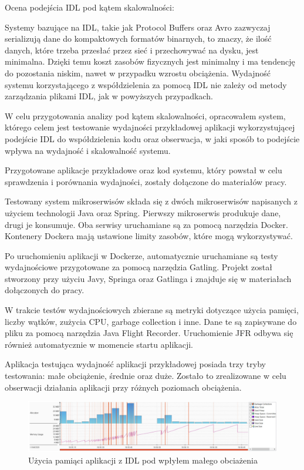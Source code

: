 \documentclass[runningheads,12pt]{llncs}
\begin{document}
Ocena podejścia IDL pod kątem skalowalności:

Systemy bazujące na IDL, takie jak Protocol Buffers oraz Avro zazwyczaj serializują dane do kompaktowych formatów binarnych, to znaczy, że ilość danych, które trzeba przesłać przez sieć i przechowywać na dysku, jest minimalna. Dzięki temu koszt zasobów fizycznych jest minimalny i ma tendencję do pozostania niskim, nawet w przypadku wzrostu obciążenia. Wydajność systemu korzystającego z współdzielenia za pomocą IDL nie zależy od metody zarządzania plikami IDL, jak w powyższych przypadkach.

W celu przygotowania analizy pod kątem skalowalności, opracowałem system, którego celem jest testowanie wydajności przykładowej aplikacji wykorzystującej podejście IDL do współdzielenia kodu oraz obserwacja, w jaki sposób to podejście wpływa na wydajność i skalowalność systemu.

Przygotowane aplikacje przykładowe oraz kod systemu, który powstał w celu sprawdzenia i porównania wydajności, zostały dołączone do materiałów pracy.

Testowany system mikroserwisów składa się z dwóch mikroserwisów napisanych z użyciem technologii Java oraz Spring. Pierwszy mikroserwis produkuje dane, drugi je konsumuje. Oba serwisy uruchamiane są za pomocą narzędzia Docker. Kontenery Dockera mają ustawione limity zasobów, które mogą wykorzystywać.

Po uruchomieniu aplikacji w Dockerze, automatycznie uruchamiane są testy wydajnościowe przygotowane za pomocą narzędzia Gatling. Projekt został stworzony przy użyciu Javy, Springa oraz Gatlinga i znajduje się w materiałach dołączonych do pracy.

W trakcie testów wydajnościowych zbierane są metryki dotyczące użycia pamięci, liczby wątków, zużycia CPU, garbage collection i inne. Dane te są zapisywane do pliku za pomocą narzędzia Java Flight Recorder. Uruchomienie JFR odbywa się również automatycznie w momencie startu aplikacji.

Aplikacja testująca wydajność aplikacji przykładowej posiada trzy tryby testowania: małe obciążenie, średnie oraz duże. Zostało to zrealizowane w celu obserwacji działania aplikacji przy różnych poziomach obciążenia.

\newpage

\begin{figure}
    \includegraphics[width=\linewidth]{images/idl-memory-low-graph.jpg}
    \caption{Użycia pamiąci aplikacji z IDL pod wpłyłem małego obciażenia} \label{fig1}
\end{figure}
\end{document}
